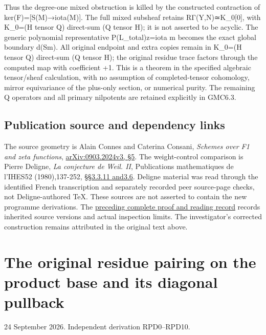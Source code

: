 Thus the degree-one mixed obstruction is killed by the constructed
contraction of ker(F)={[}S(M)→iota(M){]}. The full mixed subsheaf
retains RΓ(Y,N)≃K\_0{[}0{]}, with K\_0=(H tensor Q) direct-sum (Q tensor
H); it is not asserted to be acyclic. The generic polynomial
representative P(L\_total)z=iota m becomes the exact global boundary
d(Sm). All original endpoint and extra copies remain in K\_0=(H tensor
Q) direct-sum (Q tensor H); the original residue trace factors through
the computed map with coefficient +1. This is a theorem in the specified
algebraic tensor/sheaf calculation, with no assumption of
completed-tensor cohomology, mirror equivariance of the plus-only
section, or numerical purity. The remaining Q operators and all primary
nilpotents are retained explicitly in GMC6.3.

\section{Publication source and dependency
links}\label{publication-source-and-dependency-links-1}

The source geometry is Alain Connes and Caterina Consani, \emph{Schemes
over F1 and zeta functions},
\href{https://arxiv.org/abs/0903.2024v3}{arXiv:0903.2024v3, §5}. The
weight-control comparison is Pierre Deligne, \emph{La conjecture de
Weil. II}, Publications mathematiques de l'IHES52 (1980),137-252,
\href{https://www.numdam.org/item/PMIHES_1980__52__137_0/}{§§3.3.11
and3.6}. Deligne material was read through the identified French
transcription and separately recorded peer source-page checks, not
Deligne-authored TeX. These sources are not asserted to contain the new
programme derivations. The
\href{https://github.com/KokunoYumeto/zeta-function-research-reader/blob/36a82ecca98addb8a98b48204e349737856c7223/workbenches/splitzero-tandem/continuations/20260924-cohomology-weight-and-character-lifts/BUILD_AND_REVIEW.md}{preceding
complete proof and reading record} records inherited source versions and
actual inspection limits. The investigator's corrected construction
remains attributed in the original text above.

\chapter{The original residue pairing on the product base and its
diagonal
pullback}\label{the-original-residue-pairing-on-the-product-base-and-its-diagonal-pullback}

24 September 2026. Independent derivation RPD0--RPD10.

